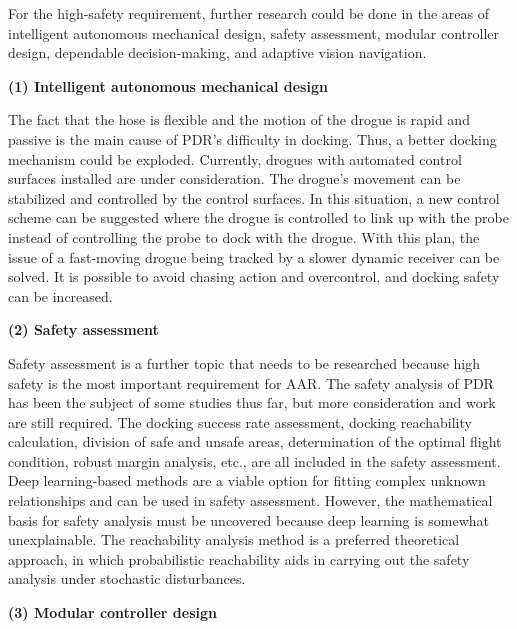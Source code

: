For the high-safety requirement, further research could be done in
the areas of intelligent autonomous mechanical design, safety assessment,
modular controller design, dependable decision-making, and adaptive
vision navigation.

\textbf{(1) Intelligent autonomous mechanical design }

The fact that the hose is flexible and the motion of the drogue is
rapid and passive is the main cause of PDR's difficulty in docking.
Thus, a better docking mechanism could be exploded. Currently, drogues
with automated control surfaces installed are under consideration.
The drogue's movement can be stabilized and controlled by the control
surfaces. In this situation, a new control scheme can be suggested
where the drogue is controlled to link up with the probe instead of
controlling the probe to dock with the drogue. With this plan, the
issue of a fast-moving drogue being tracked by a slower dynamic receiver
can be solved. It is possible to avoid chasing action and overcontrol,
and docking safety can be increased. 

\textbf{(2) Safety assessment} 

Safety assessment is a further topic that needs to be researched because
high safety is the most important requirement for AAR. The safety
analysis of PDR has been the subject of some studies thus far, but
more consideration and work are still required. The docking success
rate assessment, docking reachability calculation, division of safe
and unsafe areas, determination of the optimal flight condition, robust
margin analysis, etc., are all included in the safety assessment.
Deep learning-based methods are a viable option for fitting complex
unknown relationships and can be used in safety assessment. However,
the mathematical basis for safety analysis must be uncovered because
deep learning is somewhat unexplainable. The reachability analysis
method is a preferred theoretical approach, in which probabilistic
reachability aids in carrying out the safety analysis under stochastic
disturbances. 

\textbf{(3) Modular controller design }

